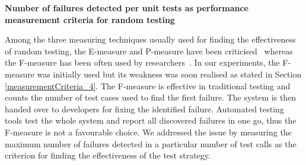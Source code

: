   
    







\textbf{Number of failures detected per unit tests as performance measurement criteria for random testing}

Among the three measuring techniques usually used for finding the effectiveness of random testing, the E-measure and P-measure have been criticised~\cite{chen2005adaptive, chen2007quasi, chan2006restricted} whereas the F-measure has been often used by researchers~\cite{chen2004statistical, chen1996expected}. In our experiments, the F-measure was initially used but its weakness was soon realised as stated in Section \ref{measurementCriteria_4}. The F-measure is effective in traditional testing and counts the number of test cases used to find the first failure. The system is then handed over to developers for fixing the identified failure. Automated testing tools test the whole system and report all discovered failures in one go, thus the F-measure is not a favourable choice. We addressed the issue by measuring the maximum number of failures detected in a particular number of test calls as the criterion for finding the effectiveness of the test strategy.\\

